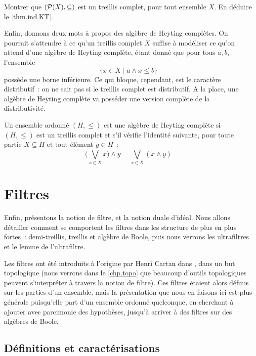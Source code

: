 \begin{exercise}
  Montrer que $(\mathcal{P}(X),\subseteq)$ est un treillis complet, pour tout
  ensemble $X$. En déduire le \cref{thm.ind.KT}.
\end{exercise}

Enfin, donnons deux mots à propos des algèbre de Heyting complètes. On pourrait
s'attendre à ce qu'un treillis complet $X$ suffise à modéliser ce qu'on attend
d'une algèbre de Heyting complète, étant donné que pour tous $a,b$, l'ensemble
\[\{x \in X \mid a \land x \leq b\}\]
possède une borne inférieure. Ce qui bloque, cependant, est le caractère
distributif~: on ne sait pas si le treillis complet est distributif. A la place,
une algèbre de Heyting complète va posséder une version complète de la
distributivité.

\begin{definition}
  Un ensemble ordonné $(H,\leq)$ est une algèbre de Heyting complète si
  $(H,\leq)$ est un treillis complet et s'il vérifie l'identité suivante, pour
  toute partie $X\subseteq H$ et tout élément $y \in H$~:
  \[\Bigg(\bigvee_{x\in X}x\Bigg) \land y = \bigvee_{x\in X}(x\land y)\]
\end{definition}

\section{Filtres}

Enfin, présentons la notion de filtre, et la notion duale d'idéal. Nous allons
détailler comment se comportent les filtres dans les structure de plus en plus
fortes~: demi-treillis, treillis et algèbre de Boole, puis nous verrons les
ultrafiltres et le lemme de l'ultrafiltre.

Les filtres ont été introduits à l'origine par Henri Cartan dans
\cite{bourbaki1971topologie}, dans un but topologique (nous verrons dans le
\cref{chp.topo} que beaucoup d'outils topologiques peuvent s'interpréter à
travers la notion de filtre). Ces filtres étaient alors définis sur les parties
d'un ensemble, mais la présentation que nous en faisons ici est plus générale
puisqu'elle part d'un ensemble ordonné quelconque, en cherchant à ajouter avec
parcimonie des hypothèses, jusqu'à arriver à des filtres sur des algèbres de
Boole.

\subsection{Définitions et caractérisations}


